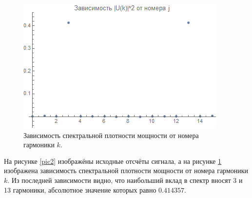 \documentclass[diploma]{nanolab2015}
\begin{document}
\begin{figure}[h!]
\centering
\includegraphics[scale=1.1]{2.png}
\caption{\label{pic3}Зависимость спектральной плотности мощности от номера гармоники $k$.}
\end{figure}

На рисунке \ref{pic2} изображёны исходные отсчёты сигнала, а на рисунке \ref{pic3} изображена зависимость спектральной плотности мощности от номера гармоники $k$. Из последней зависимости видно, что наибольший вклад в спектр вносят 3 и 13 гармоники, абсолютное значение которых равно $0.414357$.
\end{document}
